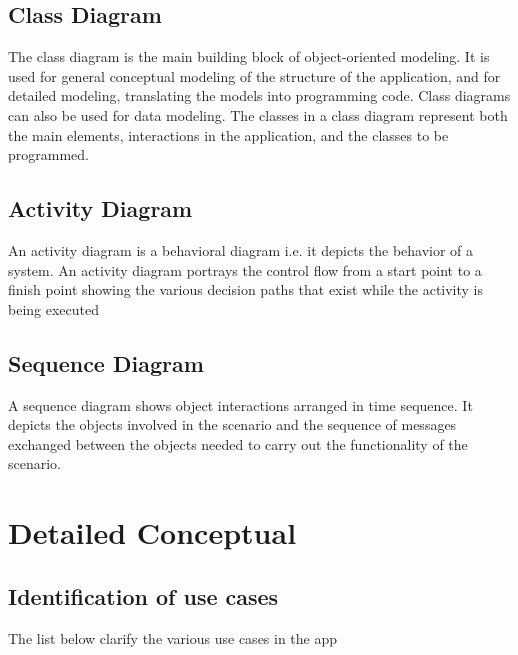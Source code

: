 \documentclass[12pt]{report}
\begin{document}
\subsection*{Class Diagram}
The class diagram is the main building block of object-oriented modeling. It is used for general conceptual modeling of the structure of the application, and for detailed modeling, translating the models into programming code. Class diagrams can also be used for data modeling. The classes in a class diagram represent both the main elements, interactions in the application, and the classes to be programmed.
\subsection*{Activity Diagram}
An activity diagram is a behavioral diagram i.e. it depicts the behavior of a system. An activity diagram portrays the control flow from a start point to a finish point showing the various decision paths that exist while the activity is being executed
\subsection*{Sequence Diagram}
A sequence diagram shows object interactions arranged in time sequence. It depicts the objects involved in the scenario and the sequence of messages exchanged between the objects needed to carry out the functionality of the scenario.

\pagebreak
\section{Detailed Conceptual}

\subsection{Identification of use cases}

The list below clarify the various use cases in the app
\end{document}

